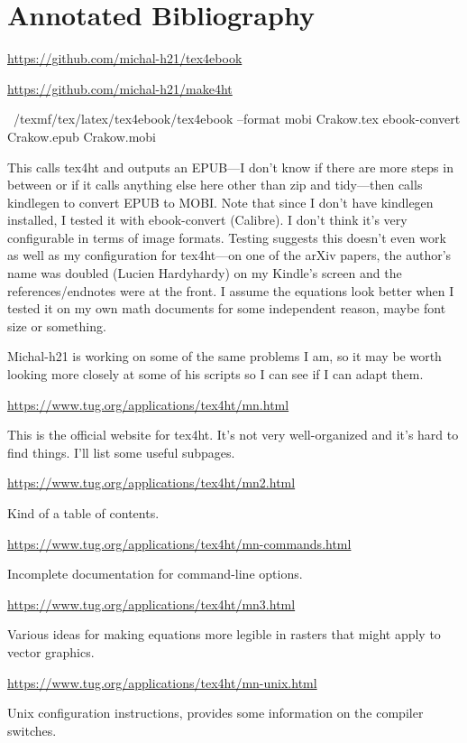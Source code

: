 \documentclass[12pt]{article}
\begin{document}
\section{Annotated Bibliography}
\label{sec:bibliography}



\url{https://github.com/michal-h21/tex4ebook}

\url{https://github.com/michal-h21/make4ht}

~/texmf/tex/latex/tex4ebook/tex4ebook --format mobi Crakow.tex
ebook-convert Crakow.epub Crakow.mobi

This calls tex4ht and outputs an EPUB---I don't know if there are more
steps in between or if it calls anything else here other than zip and
tidy---then calls kindlegen to convert EPUB to MOBI.  Note that since
I don't have kindlegen installed, I tested it with ebook-convert
(Calibre).  I don't think it's very configurable in terms of image
formats.  Testing suggests this doesn't even work as well as my
configuration for tex4ht---on one of the arXiv papers, the author's
name was doubled (Lucien Hardyhardy) on my Kindle's screen and the
references/endnotes were at the front.  I assume the equations look
better when I tested it on my own math documents for some independent
reason, maybe font size or something.

Michal-h21 is working on some of the same problems I am, so it may be
worth looking more closely at some of his scripts so I can see if I
can adapt them.


\url{https://www.tug.org/applications/tex4ht/mn.html}

This is the official website for tex4ht.  It's not very well-organized
and it's hard to find things.  I'll list some useful subpages.

\url{https://www.tug.org/applications/tex4ht/mn2.html}

Kind of a table of contents.

\url{https://www.tug.org/applications/tex4ht/mn-commands.html}

Incomplete documentation for command-line options.

\url{https://www.tug.org/applications/tex4ht/mn3.html} 

Various ideas for making equations more legible in rasters that might
apply to vector graphics.

\url{https://www.tug.org/applications/tex4ht/mn-unix.html}

Unix configuration instructions, provides some information on the
compiler switches.
\end{document}
